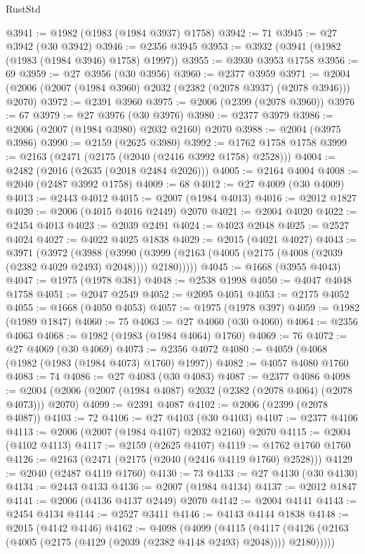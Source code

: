 \begin{lexlean}{RustStd}
\begin{coremodule}
@3941 := @1982 (@1983 (@1984 @3937) @1758)
@3942 := 71
@3945 := @27 @3942 (@30 @3942)
@3946 := @2356 @3945
@3953 := @3932 (@3941 (@1982 (@1983 (@1984 @3946) @1758) @1997))
@3955 := @3930 @3953 @1758
@3956 := 69
@3959 := @27 @3956 (@30 @3956)
@3960 := @2377 @3959
@3971 := @2004 (@2006 (@2007 (@1984 @3960) @2032 (@2382 (@2078 @3937) (@2078 @3946))) @2070)
@3972 := @2391 @3960
@3975 := @2006 (@2399 (@2078 @3960))
@3976 := 67
@3979 := @27 @3976 (@30 @3976)
@3980 := @2377 @3979
@3986 := @2006 (@2007 (@1984 @3980) @2032 @2160) @2070
@3988 := @2004 (@3975 @3986)
@3990 := @2159 (@2625 @3980)
@3992 := @1762 @1758 @1758
@3999 := @2163 (@2471 (@2175 (@2040 (@2416 @3992 @1758) @2528)))
@4004 := @2482 (@2016 (@2635 (@2018 @2484 @2026)))
@4005 := @2164 @4004
@4008 := @2040 (@2487 @3992 @1758)
@4009 := 68
@4012 := @27 @4009 (@30 @4009)
@4013 := @2443 @4012
@4015 := @2007 (@1984 @4013)
@4016 := @2012 @1827
@4020 := @2006 (@4015 @4016 @2449) @2070
@4021 := @2004 @4020
@4022 := @2454 @4013
@4023 := @2039 @2491
@4024 := @4023 @2048
@4025 := @2527 @4024
@4027 := @4022 @4025 @1838
@4029 := @2015 (@4021 @4027)
@4043 := @3971
    (@3972
      (@3988
        (@3990 (@3999 (@2163 (@4005 (@2175 (@4008 (@2039 (@2382 @4029 @2493) @2048)))) @2180)))))
@4045 := @1668 (@3955 @4043)
@4047 := @1975 (@1978 @381)
@4048 := @2538 @1998
@4050 := @4047 @4048 @1758
@4051 := @2047 @2549
@4052 := @2095 @4051
@4053 := @2175 @4052
@4055 := @1668 (@4050 @4053)
@4057 := @1975 (@1978 @397)
@4059 := @1982 (@1989 @1847)
@4060 := 75
@4063 := @27 @4060 (@30 @4060)
@4064 := @2356 @4063
@4068 := @1982 (@1983 (@1984 @4064) @1760)
@4069 := 76
@4072 := @27 @4069 (@30 @4069)
@4073 := @2356 @4072
@4080 := @4059 (@4068 (@1982 (@1983 (@1984 @4073) @1760) @1997))
@4082 := @4057 @4080 @1760
@4083 := 74
@4086 := @27 @4083 (@30 @4083)
@4087 := @2377 @4086
@4098 := @2004 (@2006 (@2007 (@1984 @4087) @2032 (@2382 (@2078 @4064) (@2078 @4073))) @2070)
@4099 := @2391 @4087
@4102 := @2006 (@2399 (@2078 @4087))
@4103 := 72
@4106 := @27 @4103 (@30 @4103)
@4107 := @2377 @4106
@4113 := @2006 (@2007 (@1984 @4107) @2032 @2160) @2070
@4115 := @2004 (@4102 @4113)
@4117 := @2159 (@2625 @4107)
@4119 := @1762 @1760 @1760
@4126 := @2163 (@2471 (@2175 (@2040 (@2416 @4119 @1760) @2528)))
@4129 := @2040 (@2487 @4119 @1760)
@4130 := 73
@4133 := @27 @4130 (@30 @4130)
@4134 := @2443 @4133
@4136 := @2007 (@1984 @4134)
@4137 := @2012 @1847
@4141 := @2006 (@4136 @4137 @2449) @2070
@4142 := @2004 @4141
@4143 := @2454 @4134
@4144 := @2527 @3411
@4146 := @4143 @4144 @1838
@4148 := @2015 (@4142 @4146)
@4162 := @4098
    (@4099
      (@4115
        (@4117 (@4126 (@2163 (@4005 (@2175 (@4129 (@2039 (@2382 @4148 @2493) @2048)))) @2180)))))

\end{coremodule}
\end{lexlean}
